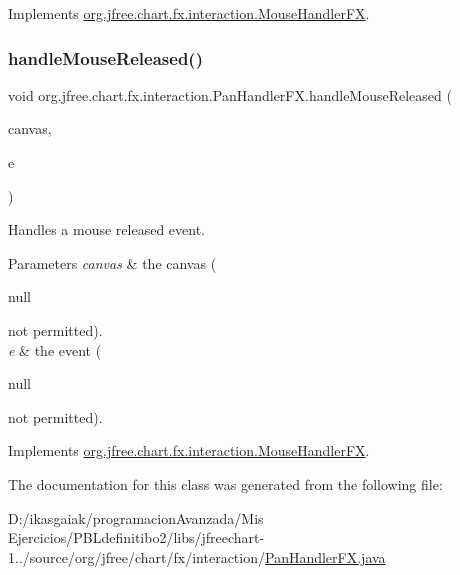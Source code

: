Implements \mbox{\hyperlink{interfaceorg_1_1jfree_1_1chart_1_1fx_1_1interaction_1_1_mouse_handler_f_x_a0cf92e5a448b58c199fc12dbdbd39aab}{org.\+jfree.\+chart.\+fx.\+interaction.\+Mouse\+Handler\+FX}}.

\mbox{\label{classorg_1_1jfree_1_1chart_1_1fx_1_1interaction_1_1_pan_handler_f_x_ade3d5c9bd4ada9f2357231eefc89ff4e}} 
\subsubsection{\texorpdfstring{handle\+Mouse\+Released()}{handleMouseReleased()}}
{\footnotesize\ttfamily void org.\+jfree.\+chart.\+fx.\+interaction.\+Pan\+Handler\+F\+X.\+handle\+Mouse\+Released (\begin{DoxyParamCaption}\item[{\mbox{\hyperlink{classorg_1_1jfree_1_1chart_1_1fx_1_1_chart_canvas}{Chart\+Canvas}}}]{canvas,  }\item[{Mouse\+Event}]{e }\end{DoxyParamCaption})}

Handles a mouse released event.


\begin{DoxyParams}{Parameters}
{\em canvas} & the canvas (
\begin{DoxyCode}
null 
\end{DoxyCode}
 not permitted). \\
\hline
{\em e} & the event (
\begin{DoxyCode}
null 
\end{DoxyCode}
 not permitted). \\
\hline
\end{DoxyParams}


Implements \mbox{\hyperlink{interfaceorg_1_1jfree_1_1chart_1_1fx_1_1interaction_1_1_mouse_handler_f_x_adbb7fa38b9913c536fb2a3ae09c70058}{org.\+jfree.\+chart.\+fx.\+interaction.\+Mouse\+Handler\+FX}}.



The documentation for this class was generated from the following file\+:\begin{DoxyCompactItemize}
\item 
D\+:/ikasgaiak/programacion\+Avanzada/\+Mis Ejercicios/\+P\+B\+Ldefinitibo2/libs/jfreechart-\/1../source/org/jfree/chart/fx/interaction/\mbox{\hyperlink{_pan_handler_f_x_8java}{Pan\+Handler\+F\+X.\+java}}\end{DoxyCompactItemize}
